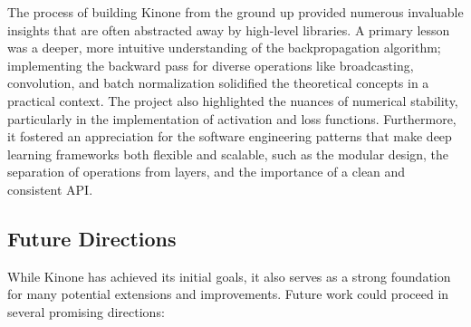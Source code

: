 \documentclass[a4paper]{article}
\begin{document}
The process of building Kinone from the ground up provided numerous invaluable insights that are often abstracted away by high-level libraries. A primary lesson was a deeper, more intuitive understanding of the backpropagation algorithm; implementing the backward pass for diverse operations like broadcasting, convolution, and batch normalization solidified the theoretical concepts in a practical context. The project also highlighted the nuances of numerical stability, particularly in the implementation of activation and loss functions. Furthermore, it fostered an appreciation for the software engineering patterns that make deep learning frameworks both flexible and scalable, such as the modular design, the separation of operations from layers, and the importance of a clean and consistent API.

\subsection{Future Directions}

While Kinone has achieved its initial goals, it also serves as a strong foundation for many potential extensions and improvements. Future work could proceed in several promising directions:
\end{document}
